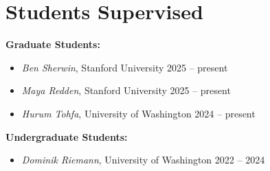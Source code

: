\section{Students Supervised}

\textbf{Graduate Students:}
\begin{itemize}
    \item \textit{Ben Sherwin}, Stanford University \hfill 2025 -- present
    \item \textit{Maya Redden}, Stanford University \hfill 2025 -- present
    \item \textit{Hurum Tohfa}, University of Washington \hfill 2024 -- present
\end{itemize}

\textbf{Undergraduate Students:}
\begin{itemize}
    \item \textit{Dominik Riemann}, University of Washington \hfill 2022 -- 2024
\end{itemize}